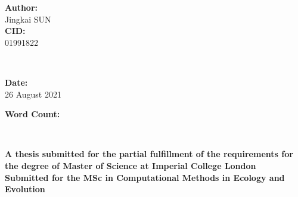 \begin{titlepage}

    \begin{minipage}{0.4\textwidth}
      \begin{flushleft} \large

      \textbf{Author:}\\
      Jingkai \textsc{SUN} \\

      \textbf{CID:}\\
      01991822



      \end{flushleft}
      \end{minipage}
      ~
      \begin{minipage}{0.5\textwidth}
      \begin{flushright} \large

      \textbf{Date:}\\
      26 August 2021

      \textbf{Word Count:} \\
      \quickwordcount


      \end{flushright}
    \end{minipage} \\ [5cm]



    \vskip 0.7in
    \par
    \large
    \textbf{A thesis submitted for the partial fulfillment of the requirements for the degree of Master of Science at Imperial College London} \\ [0.5cm]
    \textbf{Submitted for the MSc in Computational Methods in Ecology and Evolution}
    \vfil





    \vfill %

\end{titlepage}
